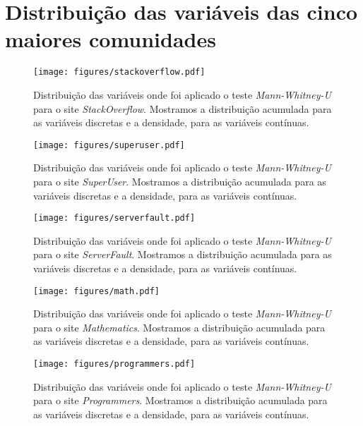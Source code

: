 \chapter{Distribuição das variáveis das cinco maiores comunidades}
\label{app:distrib}

\begin{figure}
  \centering
  \texttt{[image: figures/stackoverflow.pdf]}
  \caption[Distribuição das variáveis para o site \emph{StackOverflow}]{Distribuição das variáveis onde foi aplicado o teste \emph{Mann-Whitney-U} para o site \emph{StackOverflow}. Mostramos a distribuição acumulada para as variáveis discretas e a densidade, para as variáveis contínuas. }
\end{figure}

\begin{figure}
	\centering
  \texttt{[image: figures/superuser.pdf]}
 \caption[Distribuição das variáveis para o site \emph{SuperUser}]{Distribuição das variáveis onde foi aplicado o teste \emph{Mann-Whitney-U} para o site \emph{SuperUser}. Mostramos a distribuição acumulada para as variáveis discretas e a densidade, para as variáveis contínuas. }
\end{figure}

\begin{figure}
	\centering
  \texttt{[image: figures/serverfault.pdf]}
  \caption[Distribuição das variáveis para o site \emph{ServerFault}]{Distribuição das variáveis onde foi aplicado o teste \emph{Mann-Whitney-U} para o site \emph{ServerFault}. Mostramos a distribuição acumulada para as variáveis discretas e a densidade, para as variáveis contínuas. }
\end{figure}

\begin{figure}
	\centering
  \texttt{[image: figures/math.pdf]}
  \caption[Distribuição das variáveis para o site \emph{Mathematics}]{Distribuição das variáveis onde foi aplicado o teste \emph{Mann-Whitney-U} para o site \emph{Mathematics}. Mostramos a distribuição acumulada para as variáveis discretas e a densidade, para as variáveis contínuas. }
\end{figure}

\begin{figure}
  \centering
  \texttt{[image: figures/programmers.pdf]}
  \caption[Distribuição das variáveis para o site \emph{Programmers}]{Distribuição das variáveis onde foi aplicado o teste \emph{Mann-Whitney-U} para o site \emph{Programmers}. Mostramos a distribuição acumulada para as variáveis discretas e a densidade, para as variáveis contínuas. }
\end{figure}
